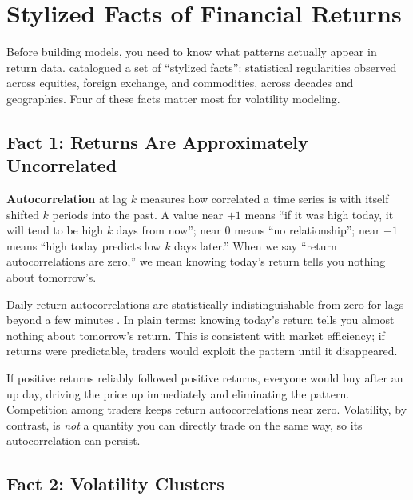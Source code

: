 \section{Stylized Facts of Financial Returns}
\label{sec:stylized-facts}

Before building models, you need to know what patterns actually appear in return data.
\citet{Cont2001} catalogued a set of ``stylized facts'': statistical regularities observed across equities, foreign exchange, and commodities, across decades and geographies.
Four of these facts matter most for volatility modeling.

\subsection{Fact 1: Returns Are Approximately Uncorrelated}
\label{sec:fact-uncorrelated}

\begin{prereq}[Autocorrelation]
\textbf{Autocorrelation} at lag $k$ measures how correlated a time series is with itself shifted $k$ periods into the past.
A value near $+1$ means ``if it was high today, it will tend to be high $k$ days from now''; near $0$ means ``no relationship''; near $-1$ means ``high today predicts low $k$ days later.''
When we say ``return autocorrelations are zero,'' we mean knowing today's return tells you nothing about tomorrow's.
\end{prereq}

Daily return autocorrelations are statistically indistinguishable from zero for lags beyond a few minutes \citep{Cont2001}.
In plain terms: knowing today's return tells you almost nothing about tomorrow's return.
This is consistent with market efficiency; if returns were predictable, traders would exploit the pattern until it disappeared.

\begin{intuition}
If positive returns reliably followed positive returns, everyone would buy after an up day, driving the price up immediately and eliminating the pattern.
Competition among traders keeps return autocorrelations near zero.
Volatility, by contrast, is \emph{not} a quantity you can directly trade on the same way, so its autocorrelation can persist.
\end{intuition}

\subsection{Fact 2: Volatility Clusters}
\label{sec:fact-clustering}

